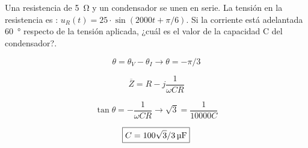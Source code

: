 \documentclass[12pt]{article}
\begin{document}
\title{}

\date{Marzo 2020}

\section{}



Una resistencia de \SI{5}{\ohm} y un condensador se unen en serie. La tensión en la resistencia es : $u_R(t) = 25 \cdot \sin(2000t + \pi/6)$. Si la corriente está adelantada \SI{60}{\degree} respecto de la tensión aplicada, ¿cuál es el valor de la capacidad C del condensador?.

\begin{equation*}
    \theta = \theta_V - \theta_I \rightarrow \theta = -\pi/3
\end{equation*}

\begin{equation*}
    \overline{Z} = R - j \frac{1}{\omega C R}
  \end{equation*}
  
\begin{equation*}
  \tan \theta = - \frac{1}{\omega C R} \rightarrow \sqrt{3} = \frac{1}{10000 C}
\end{equation*}

\begin{equation*}
  \boxed{C = \SI[parse-numbers = false]{100\sqrt{3}/3}{\micro\farad}}
\end{equation*}

\clearpage


\section{}


\end{document}
